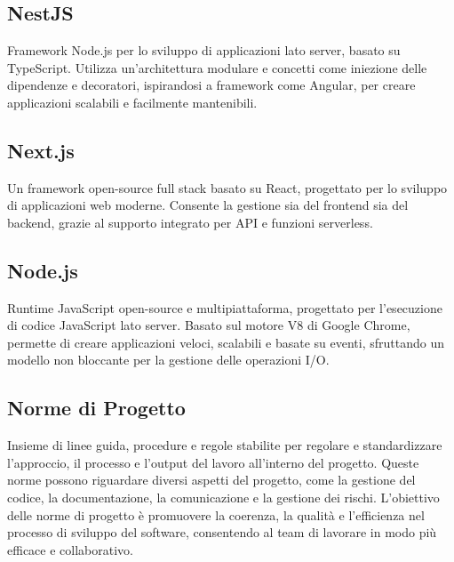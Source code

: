 
\section{}

\hypertarget{sec:nestjs}{}
\subsection*{NestJS}
Framework Node.js per lo sviluppo di applicazioni lato server, basato su TypeScript. Utilizza un'architettura modulare e concetti come iniezione delle 
dipendenze e decoratori, ispirandosi a framework come Angular, per creare applicazioni scalabili e facilmente mantenibili.

\hypertarget{sec:nextjs}{}
\subsection*{Next.js}
Un framework open-source full stack basato su React, progettato per lo sviluppo di applicazioni web moderne. Consente la gestione sia del frontend sia 
del backend, grazie al supporto integrato per API e funzioni serverless.

\hypertarget{sec:nodejs}{}
\subsection*{Node.js}
Runtime JavaScript open-source e multipiattaforma, progettato per l'esecuzione di codice JavaScript lato server. Basato sul motore V8 di Google Chrome, 
permette di creare applicazioni veloci, scalabili e basate su eventi, sfruttando un modello non bloccante per la gestione delle operazioni I/O.

\subsection*{Norme di Progetto}
Insieme di linee guida, procedure e regole stabilite per regolare e standardizzare l’approccio, il processo e l’output del lavoro all’interno del progetto. 
Queste norme possono riguardare diversi aspetti del progetto, come la gestione del codice, la documentazione, la comunicazione e la gestione dei rischi. 
L’obiettivo delle norme di progetto è promuovere la coerenza, la qualità e l’efficienza nel processo di sviluppo del software, consentendo al team di 
lavorare in modo più efficace e collaborativo.

\newpage


